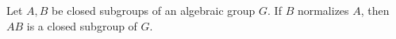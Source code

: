 Let $A, B$ be closed subgroups of an algebraic group $G$. If $B$ normalizes $A$, then $AB$ is a closed subgroup of $G$.
